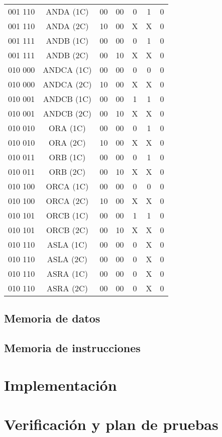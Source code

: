 \documentclass[paper=letter, fontsize=12pt]{article}
\begin{document}
\begin{table}[h]
\begin{tabular}{cc|ccccc}
001 110 		 & ANDA (1C) 	& 00 	& 00    & 0     & 1     & 0 \\
001 110 		 & ANDA (2C)	& 10 	& 00    & X     & X     & 0 \\
001 111 		 & ANDB (1C)	& 00 	& 00    & 0     & 1     & 0 \\
001 111 		 & ANDB (2C)	& 00 	& 10    & X     & X     & 0 \\
010 000 		 & ANDCA (1C)	& 00 	& 00    & 0     & 0     & 0 \\
010 000 		 & ANDCA (2C) 	& 10 	& 00    & X     & X     & 0 \\
010 001 		 & ANDCB (1C) 	& 00 	& 00    & 1     & 1     & 0 \\
010 001 		 & ANDCB (2C) 	& 00 	& 10    & X     & X     & 0 \\
010 010 		 & ORA (1C)   	& 00 	& 00    & 0     & 1     & 0 \\
010 010 		 & ORA (2C)	    & 10 	& 00    & X     & X     & 0 \\
010 011 		 & ORB (1C)	    & 00 	& 00    & 0     & 1     & 0 \\
010 011 		 & ORB (2C)	    & 00 	& 10    & X     & X     & 0 \\
010 100 		 & ORCA (1C)  	& 00 	& 00    & 0     & 0     & 0 \\
010 100 		 & ORCA (2C)   	& 10 	& 00    & X     & X     & 0 \\
010 101 		 & ORCB (1C)   	& 00 	& 00    & 1     & 1     & 0 \\
010 101 		 & ORCB (2C)   	& 00 	& 10    & X     & X     & 0 \\
010 110 		 & ASLA (1C)   	& 00 	& 00    & 0     & X     & 0 \\
010 110 		 & ASLA (2C)   	& 00 	& 00    & 0     & X     & 0 \\
010 110 		 & ASRA (1C)   	& 00 	& 00    & 0     & X     & 0 \\
010 110 		 & ASRA (2C)   	& 00 	& 00    & 0     & X     & 0 \\


\end{tabular}
\end{table}

\subsection{Memoria de datos}

\subsection{Memoria de instrucciones}

\section{Implementación}

\section{Verificación y plan de pruebas}
\end{document}
